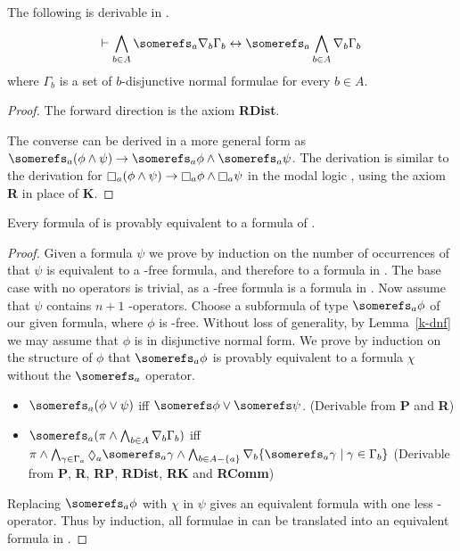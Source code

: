 \begin{lemma}
The following is derivable in \axiomKF{}.

$$
\proves \bigwedge_{b \in A} \somerefs_a \covers_b \Gamma_b \iff
\somerefs_a \bigwedge_{b \in A} \covers_b \Gamma_b \\
$$
where $\Gamma_b$ is a set of $b$-disjunctive normal formulae for
every $b \in A$.
\end{lemma}

\begin{proof}
The forward direction is the axiom {\bf RDist}. 

The converse can be derived in a more general form as $\somerefs_a (\phi \land
\psi) \implies \somerefs_a \phi \land \somerefs_a \psi$. The derivation is
similar to the derivation for $\knows_a (\phi \land \psi) \implies \knows_a \phi
\land \knows_a \psi$ in the modal logic \logicK{}, using the axiom {\bf R} in
place of {\bf K}.
\end{proof}

\begin{lemma}\label{k-translation}
Every formula of \logicKF{} is provably equivalent to a formula of \logicK{}.
\end{lemma}

\begin{proof}
Given a formula $\psi$ we prove by induction on the number of occurrences of
\somerefs{} that $\psi$ is equivalent to a \somerefs-free formula, and
therefore to a formula in \logicK{}. The base case with no \somerefs operators
is trivial, as a \somerefs-free formula is a formula in \logicK{}. Now assume
that $\psi$ contains $n + 1$ \somerefs-operators. Choose a subformula of type
$\somerefs_a \phi$ of our given formula, where $\phi$ is \somerefs-free. Without
loss of generality, by Lemma~\ref{k-dnf} we may assume that $\phi$ is in
disjunctive normal form.  We prove by induction on the structure of $\phi$ that
$\somerefs_a \phi$ is provably equivalent to a formula $\chi$ without the
$\somerefs_a$ operator.

\begin{itemize}
\item $\somerefs_a (\phi \lor \psi)$ iff $\somerefs \phi \lor \somerefs \psi$.
(Derivable from {\bf P} and {\bf R})
\item $\somerefs_a (\pi \land \bigwedge_{b \in A} \covers_b \Gamma_b)$ iff
$\pi \land \bigwedge_{\gamma \in \Gamma_a} \suspects_a \somerefs_a \gamma \land
\bigwedge_{b \in A - \{a\}} \covers_b \{\somerefs_a \gamma \mid \gamma \in
\Gamma_b\}$ (Derivable from {\bf P}, {\bf R}, {\bf RP}, {\bf RDist}, {\bf
RK} and {\bf RComm})
\end{itemize}

Replacing $\somerefs_a \phi$ with $\chi$ in $\psi$ gives an equivalent formula
with one less \somerefs-operator. Thus by induction, all formulae in \logicKF{}
can be translated into an equivalent formula in \logicK{}.
\end{proof}


